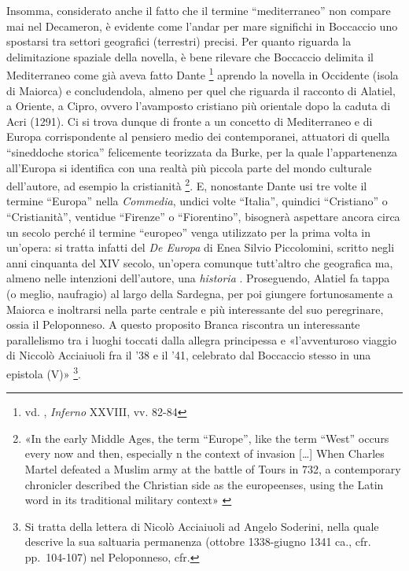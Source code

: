 Insomma, considerato anche il fatto che il termine ``mediterraneo'' non
compare mai nel Decameron, è evidente come l'andar per mare significhi
in Boccaccio uno spostarsi tra settori geografici (terrestri) precisi.
Per quanto riguarda la delimitazione spaziale della novella, è bene
rilevare che Boccaccio delimita il Mediterraneo come già aveva fatto
Dante \footnote{vd. \textcite{Commedia}, \emph{Inferno} XXVIII, vv.
  82-84} aprendo la novella in Occidente (isola di Maiorca) e
concludendola, almeno per quel che riguarda il racconto di Alatiel, a
Oriente, a Cipro, ovvero l'avamposto cristiano più orientale dopo la
caduta di Acri (1291). Ci si trova dunque di fronte a un concetto di
Mediterraneo e di Europa corrispondente al pensiero medio dei
contemporanei, attuatori di quella ``sineddoche storica'' felicemente
teorizzata da Burke, per la quale l'appartenenza all'Europa si
identifica con una realtà più piccola parte del mondo culturale
dell'autore, ad esempio la cristianità \footnote{«In the early Middle
  Ages, the term ``Europe'', like the term ``West'' occurs every now and
  then, especially n the context of invasion {[}\ldots{}{]} When Charles
  Martel defeated a Muslim army at the battle of Tours in 732, a
  contemporary chronicler described the Christian side as the
  europeenses, using the Latin word in its traditional military context»
  \autocite[p.~23]{burke1980}}. E, nonostante Dante usi tre volte il
termine ``Europa'' nella \emph{Commedia}, undici volte ``Italia'',
quindici ``Cristiano'' o ``Cristianità'', ventidue ``Firenze'' o
``Fiorentino'', bisognerà aspettare ancora circa un secolo perché il
termine ``europeo'' venga utilizzato per la prima volta in un'opera: si
tratta infatti del \emph{De Europa} di Enea Silvio Piccolomini, scritto
negli anni cinquanta del XIV secolo, un'opera comunque tutt'altro che
geografica ma, almeno nelle intenzioni dell'autore, una \emph{historia}
\autocite{baldi2007}. Proseguendo, Alatiel fa tappa (o meglio,
naufragio) al largo della Sardegna, per poi giungere fortunosamente a
Maiorca e inoltrarsi nella parte centrale e più interessante del suo
peregrinare, ossia il Peloponneso. A questo proposito Branca riscontra
un interessante parallelismo tra i luoghi toccati dalla allegra
principessa e «l'avventuroso viaggio di Niccolò Acciaiuoli fra il '38 e
il '41, celebrato dal Boccaccio stesso in una epistola (V)» \footnote{\autocite[p.~147]{brancamedievale}
  Si tratta della lettera di Nicolò Acciaiuoli ad Angelo Soderini, nella
  quale descrive la sua saltuaria permanenza (ottobre 1338-giugno 1341
  ca., cfr. pp.~104-107) nel Peloponneso, cfr.\autocite{palmieri1934}}.

